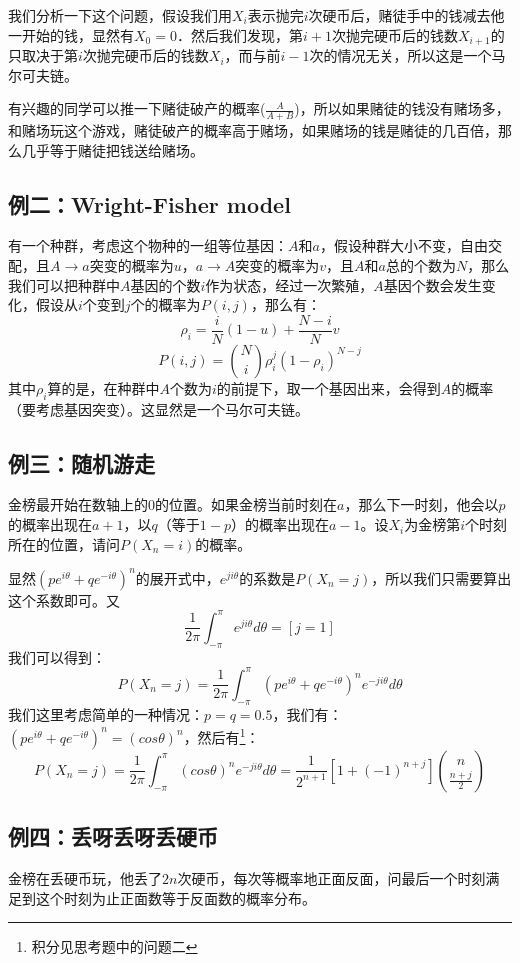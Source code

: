 		我们分析一下这个问题，假设我们用$X_i$表示抛完$i$次硬币后，赌徒手中的钱减去他一开始的钱，显然有$X_0 = 0$．然后我们发现，第$i+1$次抛完硬币后的钱数$X_{i+1}$的只取决于第$i$次抛完硬币后的钱数$X_i$，而与前$i-1$次的情况无关，所以这是一个马尔可夫链。
		
		\remark 有兴趣的同学可以推一下赌徒破产的概率($\frac{A}{A+B}$)，所以如果赌徒的钱没有赌场多，和赌场玩这个游戏，赌徒破产的概率高于赌场，如果赌场的钱是赌徒的几百倍，那么几乎等于赌徒把钱送给赌场。
		
		\subsection{例二：Wright-Fisher model}
		有一个种群，考虑这个物种的一组等位基因：$A$和$a$，假设种群大小不变，自由交配，且$A\rightarrow a$突变的概率为$u$，$a\rightarrow A$突变的概率为$v$，且$A$和$a$总的个数为$N$，那么我们可以把种群中$A$基因的个数$i$作为状态，经过一次繁殖，$A$基因个数会发生变化，假设从$i$个变到$j$个的概率为$P(i,j)$，那么有：
		$$
			\rho_i = \frac{i}{N}(1-u)+\frac{N-i}{N}v
		$$
		$$
			P(i,j) = \binom{N}{i}\rho_i^j(1-\rho_i)^{N-j}
		$$
		其中$\rho_i$算的是，在种群中$A$个数为$i$的前提下，取一个基因出来，会得到$A$的概率（要考虑基因突变）。这显然是一个马尔可夫链。
		
		\subsection{例三：随机游走}
		金榜最开始在数轴上的$0$的位置。如果金榜当前时刻在$a$，那么下一时刻，他会以$p$的概率出现在$a+1$，以$q$（等于$1-p$）的概率出现在$a-1$。设$X_i$为金榜第$i$个时刻所在的位置，请问$P(X_n = i)$的概率。
		
		\proof 显然$(pe^{i\theta}+qe^{-i\theta})^n$的展开式中，$e^{ji\theta}$的系数是$P(X_n=j)$，所以我们只需要算出这个系数即可。又
		$$
		\frac{1}{2\pi}\int_{-\pi}^{\pi}e^{ji\theta}d\theta = [j = 1]
		$$
		我们可以得到：
		$$
			P(X_n=j) = \frac{1}{2\pi}\int_{-\pi}^{\pi}(pe^{i\theta}+qe^{-i\theta})^ne^{-ji\theta}d\theta
		$$
		我们这里考虑简单的一种情况：$p = q = 0.5$，我们有：$(pe^{i\theta}+qe^{-i\theta})^n = (cos\theta)^n$，然后有\footnote{积分见思考题中的问题二}：
		$$
			P(X_n=j) = \frac{1}{2\pi}\int_{-\pi}^{\pi}(cos\theta)^ne^{-ji\theta}d\theta = \frac{1}{2^{n+1}}[1+(-1)^{n+j}]\binom{n}{\frac{n+j}{2}}
		$$
		
		\subsection{例四：丢呀丢呀丢硬币}
		金榜在丢硬币玩，他丢了$2n$次硬币，每次等概率地正面反面，问最后一个时刻满足到这个时刻为止正面数等于反面数的概率分布。
		
